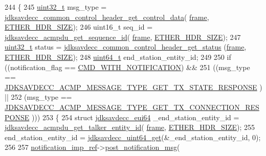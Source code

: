 \begin{DoxyCode}
244 \{
245     \hyperlink{parse_8c_a6eb1e68cc391dd753bc8ce896dbb8315}{uint32\_t} msg\_type = 
      \hyperlink{group__jdksavdecc__avtp__common__control__header_gacb435e5d647474931972cb9eb93b4e41}{jdksavdecc\_common\_control\_header\_get\_control\_data}(
      \hyperlink{gst__avb__playbin_8c_ac8e710e0b5e994c0545d75d69868c6f0}{frame}, \hyperlink{namespaceavdecc__lib_a6c827b1a0d973e18119c5e3da518e65ca9512ad9b34302ba7048d88197e0a2dc0}{ETHER\_HDR\_SIZE});
246     uint16\_t seq\_id = \hyperlink{group__acmpdu_gaf20d00ac6431b19d3f1213b4b6bf6fd5}{jdksavdecc\_acmpdu\_get\_sequence\_id}(
      \hyperlink{gst__avb__playbin_8c_ac8e710e0b5e994c0545d75d69868c6f0}{frame}, \hyperlink{namespaceavdecc__lib_a6c827b1a0d973e18119c5e3da518e65ca9512ad9b34302ba7048d88197e0a2dc0}{ETHER\_HDR\_SIZE});
247     \hyperlink{parse_8c_a6eb1e68cc391dd753bc8ce896dbb8315}{uint32\_t} status = \hyperlink{group__jdksavdecc__avtp__common__control__header_ga4a4d44fa74bdb873eab982d74862273c}{jdksavdecc\_common\_control\_header\_get\_status}
      (\hyperlink{gst__avb__playbin_8c_ac8e710e0b5e994c0545d75d69868c6f0}{frame}, \hyperlink{namespaceavdecc__lib_a6c827b1a0d973e18119c5e3da518e65ca9512ad9b34302ba7048d88197e0a2dc0}{ETHER\_HDR\_SIZE});
248     \hyperlink{parse_8c_aec6fcb673ff035718c238c8c9d544c47}{uint64\_t} end\_station\_entity\_id;
249 
250     \textcolor{keywordflow}{if} ((notification\_flag == \hyperlink{namespaceavdecc__lib_aabcadff06aa62be0ce47bc0646823604aba48b8a017e06fb240b650cdea965178}{CMD\_WITH\_NOTIFICATION}) &&
251         ((msg\_type == \hyperlink{group__acmp__message__type_gaf9b24b0190d5bf9cae7e37c4a31cda12}{JDKSAVDECC\_ACMP\_MESSAGE\_TYPE\_GET\_TX\_STATE\_RESPONSE}
      ) ||
252          (msg\_type == \hyperlink{group__acmp__message__type_gac8d2fee5822f733200680da98472958f}{JDKSAVDECC\_ACMP\_MESSAGE\_TYPE\_GET\_TX\_CONNECTION\_RESPONSE}
      )))
253     \{
254         \textcolor{keyword}{struct }\hyperlink{structjdksavdecc__eui64}{jdksavdecc\_eui64} \_end\_station\_entity\_id = 
      \hyperlink{group__acmpdu_ga9efe0b94b146760a8849d872d2a00da7}{jdksavdecc\_acmpdu\_get\_talker\_entity\_id}(
      \hyperlink{gst__avb__playbin_8c_ac8e710e0b5e994c0545d75d69868c6f0}{frame}, \hyperlink{namespaceavdecc__lib_a6c827b1a0d973e18119c5e3da518e65ca9512ad9b34302ba7048d88197e0a2dc0}{ETHER\_HDR\_SIZE});
255         end\_station\_entity\_id = \hyperlink{group__endian_gac8c2b48b7d7db101708e0197e366ac42}{jdksavdecc\_uint64\_get}(&\_end\_station\_entity\_id, 0);
256 
257         \hyperlink{namespaceavdecc__lib_aca078f7550e970a17b3f732c26bc3d83}{notification\_imp\_ref}->\hyperlink{classavdecc__lib_1_1notification_a2775ca78354ea78d68bf107c084b3822}{post\_notification\_msg}(

\end{DoxyCode}

